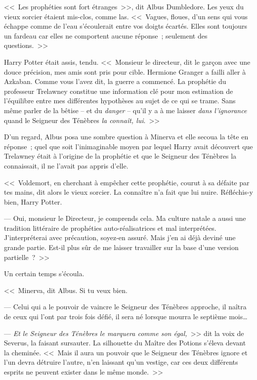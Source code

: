 <<~Les prophéties sont fort étranges~>>, dit Albus Dumbledore. Les yeux du vieux sorcier étaient mis-clos, comme las. <<~Vagues, floues, d'un sens qui vous échappe comme de l'eau s'écoulerait entre vos doigts écartés. Elles sont toujours un fardeau car elles ne comportent aucune réponse~; seulement des questions.~>>

Harry Potter était assis, tendu. <<~Monsieur le directeur, dit le garçon avec une douce précision, mes amis sont pris pour cible. Hermione Granger a failli aller à Azkaban. Comme vous l'avez dit, la guerre a commencé. La prophétie du professeur Trelawney constitue une information clé pour mon estimation de l'équilibre entre mes différentes hypothèses au sujet de ce qui se trame. Sans même parler de la bêtise -- et du \emph{danger} -- qu'il y a à me laisser \emph{dans l'ignorance} quand le Seigneur des Ténèbres \emph{la connaît, lui}.~>>

D'un regard, Albus posa une sombre question à Minerva et elle secoua la tête en réponse~; quel que soit l'inimaginable moyen par lequel Harry avait découvert que Trelawney était à l'origine de la prophétie et que le Seigneur des Ténèbres la connaissait, il ne l'avait pas appris d'elle.

<<~Voldemort, en cherchant à empêcher cette prophétie, courut à sa défaite par tes mains, dit alors le vieux sorcier. La connaître n'a fait que lui nuire. Réfléchis-y bien, Harry Potter.

--- Oui, monsieur le Directeur, je comprends cela. Ma culture natale a aussi une tradition littéraire de prophéties auto-réalisatrices et mal interprétées. J'interpréterai avec précaution, soyez-en assuré. Mais j'en ai déjà deviné une grande partie. Est-il plus sûr de me laisser travailler sur la base d'une version partielle~?~>>

Un certain temps s'écoula.

<<~Minerva, dit Albus. Si tu veux bien.

--- Celui qui a le pouvoir de vaincre le Seigneur des Ténèbres approche, il naîtra de ceux qui l'ont par trois fois défié, il sera né lorsque mourra le septième mois…

--- \emph{Et le Seigneur des Ténèbres le marquera comme son égal,}~>> dit la voix de Severus, la faisant sursauter. La silhouette du Maître des Potions s'éleva devant la cheminée. <<~Mais il aura un pouvoir que le Seigneur des Ténèbres ignore et l'un devra détruire l'autre, n'en laissant qu'un vestige, car ces deux différents esprits ne peuvent exister dans le même monde.~>>

